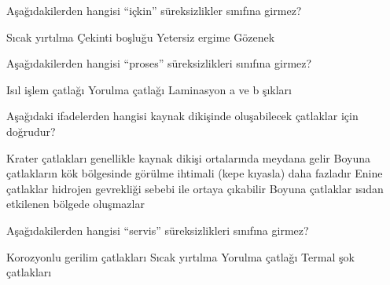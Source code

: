 \begin{question}[subtitle=]
  Aşağıdakilerden hangisi ``içkin'' süreksizlikler sınıfına girmez?
	\begin{tasks}
          \task Sıcak yırtılma
          \task Çekinti boşluğu
          \task Yetersiz ergime \correct
          \task Gözenek
	\end{tasks}
\end{question}
\begin{solution}
	\correct
\end{solution}

\begin{question}[subtitle=]
  Aşağıdakilerden hangisi ``proses'' süreksizlikleri sınıfına girmez?
	\begin{tasks}
          \task Isıl işlem çatlağı
          \task Yorulma çatlağı \correct
          \task Laminasyon
          \task a ve b şıkları
	\end{tasks}
\end{question}
\begin{solution}
	\correct
\end{solution}

\begin{question}[subtitle=]
  Aşağıdaki ifadelerden hangisi kaynak dikişinde oluşabilecek çatlaklar için doğrudur?
	\begin{tasks}
          \task Krater çatlakları genellikle kaynak dikişi ortalarında meydana gelir
          \task Boyuna çatlakların kök bölgesinde görülme ihtimali (kepe kıyasla) daha fazladır
          \task Enine çatlaklar hidrojen gevrekliği sebebi ile ortaya çıkabilir \correct
          \task Boyuna çatlaklar ısıdan etkilenen bölgede oluşmazlar
	\end{tasks}
\end{question}
\begin{solution}
	\correct
\end{solution}

\begin{question}[subtitle=]
  Aşağıdakilerden hangisi ``servis'' süreksizlikleri sınıfına girmez?
	\begin{tasks}
          \task Korozyonlu gerilim çatlakları 
          \task Sıcak yırtılma \correct
          \task Yorulma çatlağı
          \task Termal şok çatlakları
	\end{tasks}
\end{question}
\begin{solution}
	\correct
\end{solution}

